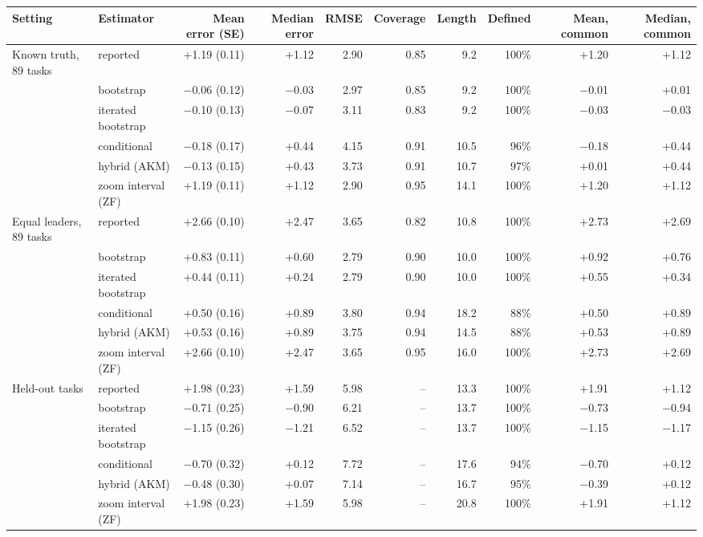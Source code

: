 \begin{tabular}{llrrrrrrrr}
\toprule
Setting & Estimator & Mean error (SE) & Median error & RMSE & Coverage & Length & Defined & Mean, common & Median, common \\
\midrule
Known truth, 89 tasks & reported & +1.19 (0.11) & +1.12 & 2.90 & 0.85 & 9.2 & 100\% & +1.20 & +1.12 \\
 & bootstrap & $-$0.06 (0.12) & $-$0.03 & 2.97 & 0.85 & 9.2 & 100\% & $-$0.01 & +0.01 \\
 & iterated bootstrap & $-$0.10 (0.13) & $-$0.07 & 3.11 & 0.83 & 9.2 & 100\% & $-$0.03 & $-$0.03 \\
 & conditional & $-$0.18 (0.17) & +0.44 & 4.15 & 0.91 & 10.5 & 96\% & $-$0.18 & +0.44 \\
 & hybrid (AKM) & $-$0.13 (0.15) & +0.43 & 3.73 & 0.91 & 10.7 & 97\% & +0.01 & +0.44 \\
 & zoom interval (ZF) & +1.19 (0.11) & +1.12 & 2.90 & 0.95 & 14.1 & 100\% & +1.20 & +1.12 \\
\addlinespace
Equal leaders, 89 tasks & reported & +2.66 (0.10) & +2.47 & 3.65 & 0.82 & 10.8 & 100\% & +2.73 & +2.69 \\
 & bootstrap & +0.83 (0.11) & +0.60 & 2.79 & 0.90 & 10.0 & 100\% & +0.92 & +0.76 \\
 & iterated bootstrap & +0.44 (0.11) & +0.24 & 2.79 & 0.90 & 10.0 & 100\% & +0.55 & +0.34 \\
 & conditional & +0.50 (0.16) & +0.89 & 3.80 & 0.94 & 18.2 & 88\% & +0.50 & +0.89 \\
 & hybrid (AKM) & +0.53 (0.16) & +0.89 & 3.75 & 0.94 & 14.5 & 88\% & +0.53 & +0.89 \\
 & zoom interval (ZF) & +2.66 (0.10) & +2.47 & 3.65 & 0.95 & 16.0 & 100\% & +2.73 & +2.69 \\
\addlinespace
Held-out tasks & reported & +1.98 (0.23) & +1.59 & 5.98 & -- & 13.3 & 100\% & +1.91 & +1.12 \\
 & bootstrap & $-$0.71 (0.25) & $-$0.90 & 6.21 & -- & 13.7 & 100\% & $-$0.73 & $-$0.94 \\
 & iterated bootstrap & $-$1.15 (0.26) & $-$1.21 & 6.52 & -- & 13.7 & 100\% & $-$1.15 & $-$1.17 \\
 & conditional & $-$0.70 (0.32) & +0.12 & 7.72 & -- & 17.6 & 94\% & $-$0.70 & +0.12 \\
 & hybrid (AKM) & $-$0.48 (0.30) & +0.07 & 7.14 & -- & 16.7 & 95\% & $-$0.39 & +0.12 \\
 & zoom interval (ZF) & +1.98 (0.23) & +1.59 & 5.98 & -- & 20.8 & 100\% & +1.91 & +1.12 \\
\bottomrule
\end{tabular}
